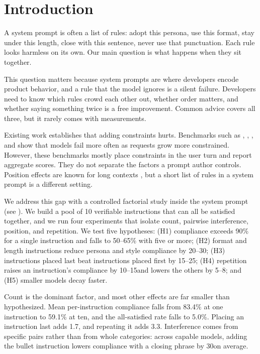 \section{Introduction}
\label{sec:intro}

A system prompt is often a list of rules: adopt this persona, use this format, stay under this length, close with this sentence, never use that punctuation. Each rule looks harmless on its own. Our main question is what happens when they sit together.

This question matters because system prompts are where developers encode product behavior, and a rule that the model ignores is a silent failure. Developers need to know which rules crowd each other out, whether order matters, and whether saying something twice is a free improvement. Common advice covers all three, but it rarely comes with measurements.

Existing work establishes that adding constraints hurts. Benchmarks such as \ifeval \citep{zhou2023ifeval}, \followbench \citep{jiang2024followbench}, \complexbench \citep{wen2024complexbench}, and \manyifeval \citep{harada2025multiply} show that models fail more often as requests grow more constrained. However, these benchmarks mostly place constraints in the user turn and report aggregate scores. They do not separate the factors a prompt author controls. Position effects are known for long contexts \citep{liu2024lost}, but a short list of rules in a system prompt is a different setting.

We address this gap with a controlled factorial study inside the system prompt (see ). We build a pool of 10 verifiable instructions that can all be satisfied together, and we run four experiments that isolate count, pairwise interference, position, and repetition. We test five hypotheses: (H1) compliance exceeds 90\% for a single instruction and falls to 50--65\% with five or more; (H2) format and length instructions reduce persona and style compliance by 20--30\pp; (H3) instructions placed last beat instructions placed first by 15--25\pp; (H4) repetition raises an instruction's compliance by 10--15\pp and lowers the others by 5--8\pp; and (H5) smaller models decay faster.

Count is the dominant factor, and most other effects are far smaller than hypothesized. Mean per-instruction compliance falls from 83.4\% at one instruction to 59.1\% at ten, and the all-satisfied rate falls to 5.0\%. Placing an instruction last adds 1.7\pp, and repeating it adds 3.3\pp. Interference comes from specific pairs rather than from whole categories: across capable models, adding the bullet instruction lowers compliance with a closing phrase by 30\pp on average.

